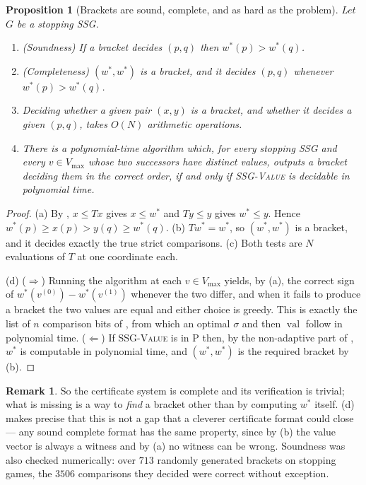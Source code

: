 \documentclass[11pt]{article}
\theoremstyle{plain}
\newtheorem{proposition}[theorem]{Proposition}
\theoremstyle{definition}
\newtheorem{remark}[theorem]{Remark}
\DeclareMathOperator{\val}{val}
\newcommand{\Vmax}{V_{\max}}
\begin{document}
\begin{proposition}[Brackets are sound, complete, and as hard as the problem]\label{prop:bracket}
Let $G$ be a stopping SSG.
\begin{enumerate}[label=(\alph*),leftmargin=2.2em]
\item \emph{(Soundness)} If a bracket decides $(p,q)$ then $w^\ast(p)>w^\ast(q)$.
\item \emph{(Completeness)} $(w^\ast,w^\ast)$ is a bracket, and it decides
  $(p,q)$ whenever $w^\ast(p)>w^\ast(q)$.
\item Deciding whether a given pair $(x,y)$ is a bracket, and whether it
  decides a given $(p,q)$, takes $O(N)$ arithmetic operations.
\item There is a polynomial-time algorithm which, for every stopping SSG
  and every $v\in\Vmax$ whose two successors have distinct values, outputs
  a bracket deciding them in the correct order, \emph{if and only if}
  \textsc{SSG-Value} is decidable in polynomial time.
\end{enumerate}
\end{proposition}

\begin{proof}
(a) By , $x\le Tx$ gives $x\le w^\ast$ and $Ty\le y$
gives $w^\ast\le y$. Hence $w^\ast(p)\ge x(p)>y(q)\ge w^\ast(q)$.
(b) $Tw^\ast=w^\ast$, so $(w^\ast,w^\ast)$ is a bracket, and it decides
exactly the true strict comparisons. (c) Both tests are $N$ evaluations of
$T$ at one coordinate each.

(d) ($\Rightarrow$) Running the algorithm at each $v\in\Vmax$ yields, by
(a), the correct sign of $w^\ast(v^{(0)})-w^\ast(v^{(1)})$ whenever the two
differ, and when it fails to produce a bracket the two values are equal
and either choice is greedy. This is exactly the list of $n$ comparison
bits of , from which an optimal $\sigma$ and
then $\val$ follow in polynomial time. ($\Leftarrow$) If
\textsc{SSG-Value} is in $\mathrm{P}$ then, by the non-adaptive part of
, $w^\ast$ is computable in polynomial time,
and $(w^\ast,w^\ast)$ is the required bracket by (b).
\end{proof}

\begin{remark}
So the certificate system is complete and its verification is trivial;
what is missing is a way to \emph{find} a bracket other than by computing
$w^\ast$ itself. (d) makes precise that this is not a
gap that a cleverer certificate format could close --- any sound complete
format has the same property, since by (b) the value vector is always a
witness and by (a) no witness can be wrong. Soundness was also checked
numerically: over $713$ randomly generated brackets on stopping games,
the $3506$ comparisons they decided were correct without exception.
\end{remark}
\end{document}
